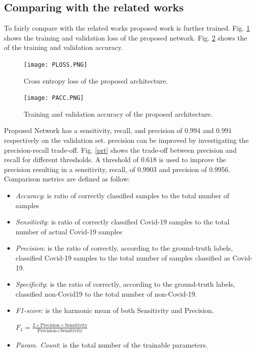 \subsection{Comparing with the related works}
To fairly compare with the related works proposed work is further trained. Fig. \ref{ploss} shows the training and validation loss of the proposed network. Fig. \ref{pacc} shows the of the training and validation accuracy. 
\begin{center}
\begin{figure}[htbp]
\centerline{\texttt{[image: PLOSS.PNG]}}
\caption{Cross entropy loss of the proposed architecture.}
\label{ploss}
\end{figure}
\end{center}
\begin{center}
\begin{figure}[htbp]
\centerline{\texttt{[image: PACC.PNG]}}
\caption{Training and validation accuracy of the proposed architecture.}
\label{pacc}
\end{figure}
\end{center}
Proposed Network has a sensitivity, recall, and precision of $0.994$ and $0.991$ respectively on the validation set. precision can be improved by investigating the precision-recall trade-off. Fig. \ref{prt} shows the trade-off between precision and recall for different thresholds. A threshold of $0.618$ is used to improve the precision resulting in a sensitivity, recall, of $0.9903$ and precision of $0.9956$.
Comparison metrics are defined as follow:
\begin{itemize}
\item \textit{Accuracy}: is ratio of correctly classified samples to the total number of samples
\item \textit{Sensitivity}: is ratio of correctly classified Covid-19 samples to the total number of actual Covid-19 samples 
\item \textit{Precision}: is the ratio of correctly, according to the ground-truth labels, classified Covid-19 samples to the total number of samples classified as Covid-19.
\item \textit{Specificity}: is the ratio of correctly, according to the ground-truth labels, classified non-Covid19 to the total number of non-Covid-19.
\item \textit{F1-score}: is the harmonic mean of both Sensitivity and Precision.
\begin{center}  
 $F_{1}=\frac{2\times\text{Precision} \times \text{Sensitivity}}{\text{Precision} + \text{Sensitivity}}$
\end{center}
\item \textit{Param. Count}: is the total number of the trainable parameters.
\end{itemize}


